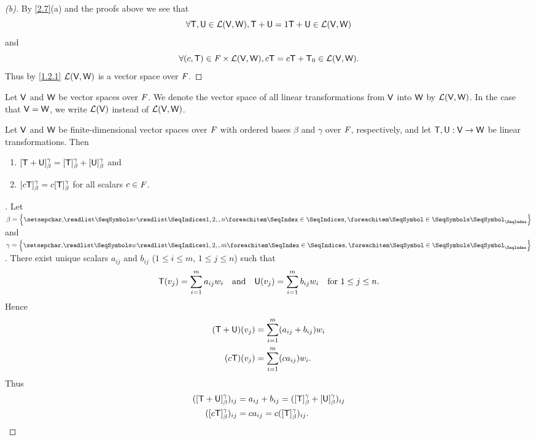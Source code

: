 \begin{proof}[(b)]
	By \cref{2.7}(a) and the proofs above we see that
	\[
		\forall \mathsf{T}, \mathsf{U} \in \mathcal{L}(\mathsf{V}, \mathsf{W}), \mathsf{T} + \mathsf{U} = 1 \mathsf{T} + \mathsf{U} \in \mathcal{L}(\mathsf{V}, \mathsf{W})
	\]
	and
	\[
		\forall (c, \mathsf{T}) \in \mathit{F} \times \mathcal{L}(\mathsf{V}, \mathsf{W}), c \mathsf{T} = c \mathsf{T} + \mathsf{T}_0 \in \mathcal{L}(\mathsf{V}, \mathsf{W}).
	\]
	Thus by \cref{1.2.1} \(\mathcal{L}(\mathsf{V}, \mathsf{W})\) is a vector space over \(\mathit{F}\).
\end{proof}

\begin{defn}\label{2.2.6}
	Let \(\mathsf{V}\) and \(\mathsf{W}\) be vector spaces over \(\mathit{F}\).
	We denote the vector space of all linear transformations from \(\mathsf{V}\) into \(\mathsf{W}\) by \(\mathcal{L}(\mathsf{V}, \mathsf{W})\).
	In the case that \(\mathsf{V} = \mathsf{W}\), we write \(\mathcal{L}(\mathsf{V})\) instead of \(\mathcal{L}(\mathsf{V}, \mathsf{W})\).
\end{defn}

\begin{thm}\label{2.8}
	Let \(\mathsf{V}\) and \(\mathsf{W}\) be finite-dimensional vector spaces over \(\mathit{F}\) with ordered bases \(\beta\) and \(\gamma\) over \(\mathit{F}\), respectively, and let \(\mathsf{T}, \mathsf{U} : \mathsf{V} \to \mathsf{W}\) be linear transformations.
	Then
	\begin{enumerate}
		\item \([\mathsf{T} + \mathsf{U}]_{\beta}^{\gamma} = [\mathsf{T}]_{\beta}^{\gamma} + [\mathsf{U}]_{\beta}^{\gamma}\) and
		\item \([c \mathsf{T}]_{\beta}^{\gamma} = c [\mathsf{T}]_{\beta}^{\gamma}\) for all scalars \(c \in \mathit{F}\).
	\end{enumerate}
\end{thm}

\begin{proof}[]
	Let \(\beta = \set{\seq{v}{1,2,,n}}\) and \(\gamma = \set{\seq{w}{1,2,,m}}\).
	There exist unique scalars \(a_{i j}\) and \(b_{i j}\) (\(1 \leq i \leq m\), \(1 \leq j \leq n\)) such that
	\[
		\mathsf{T}(v_j) = \sum_{i = 1}^m a_{i j} w_i \quad \text{and} \quad \mathsf{U}(v_j) = \sum_{i = 1}^m b_{i j} w_i \quad \text{for } 1 \leq j \leq n.
	\]
	Hence
	\begin{align*}
		(\mathsf{T} + \mathsf{U})(v_j) & = \sum_{i = 1}^m (a_{i j} + b_{i j}) w_i \\
		(c \mathsf{T})(v_j)    & = \sum_{i = 1}^m (c a_{i j}) w_i.
	\end{align*}
	Thus
	\begin{align*}
		([\mathsf{T} + \mathsf{U}]_{\beta}^{\gamma})_{i j} & = a_{i j} + b_{i j} = ([\mathsf{T}]_{\beta}^{\gamma} + [\mathsf{U}]_{\beta}^{\gamma})_{i j} \\
		([c \mathsf{T}]_{\beta}^{\gamma})_{i j}    & = c a_{i j} = c ([\mathsf{T}]_{\beta}^{\gamma})_{i j}.
	\end{align*}
\end{proof}

